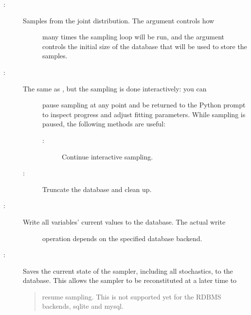 \documentclass[letterpaper,10pt,english]{sphinxmanual}
\begin{document}
\begin{description}
\item[{:}] \leavevmode\begin{description}
\item[{Samples from the joint distribution. The  argument controls how}] \leavevmode
many times the sampling loop will be run, and the  argument
controls the initial size of the database that will be used to store the
samples.

\end{description}

\item[{:}] \leavevmode\begin{description}
\item[{The same as , but the sampling is done interactively: you can}] \leavevmode
pause sampling at any point and be returned to the Python prompt to inspect
progress and adjust fitting parameters. While sampling is paused, the
following methods are useful:
\begin{description}
\item[{:}] \leavevmode
Continue interactive sampling.

\end{description}

\item[{:}] \leavevmode
Truncate the database and clean up.

\end{description}

\item[{:}] \leavevmode\begin{description}
\item[{Write all variables' current values to the database. The actual write}] \leavevmode
operation depends on the specified database backend.

\end{description}

\item[{:}] \leavevmode
Saves the current state of the sampler, including all stochastics, to the
database. This allows the sampler to be reconstituted at a later time to
\begin{quote}

resume sampling. This is not supported yet for the RDBMS backends, sqlite
and mysql.
\end{quote}


\end{description}
\end{document}
